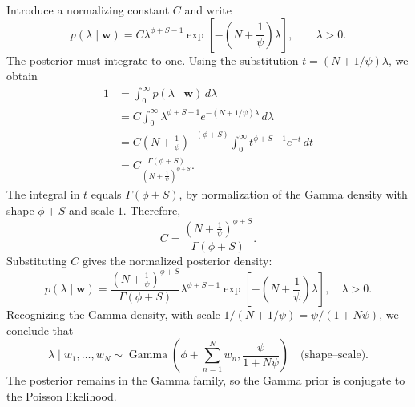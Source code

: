 \documentclass[11pt,letterpaper]{article}
\begin{document}
Introduce a normalizing constant $C$ and write
\[
  p(\lambda\mid\mathbf{w})
  =C\lambda^{\phi+S-1}
  \exp\!\left[-\left(N+\frac{1}{\psi}\right)\lambda\right],
  \qquad \lambda>0.
\]
The posterior must integrate to one. Using the substitution
$t=(N+1/\psi)\lambda$, we obtain
\begin{align*}
  1
   & =\int_{0}^{\infty}p(\lambda\mid\mathbf{w})\,d\lambda \\
   & =C\int_{0}^{\infty}\lambda^{\phi+S-1}
  e^{-(N+1/\psi)\lambda}\,d\lambda                        \\
   & =C\left(N+\frac{1}{\psi}\right)^{-(\phi+S)}
  \int_{0}^{\infty}t^{\phi+S-1}e^{-t}\,dt                 \\
   & =C\frac{\Gamma(\phi+S)}
  {\left(N+\frac{1}{\psi}\right)^{\phi+S}}.
\end{align*}
The integral in $t$ equals $\Gamma(\phi+S)$, by normalization of the
Gamma density with shape $\phi+S$ and scale $1$.
Therefore,
\[
  C=\frac{\left(N+\frac{1}{\psi}\right)^{\phi+S}}
  {\Gamma(\phi+S)}.
\]
Substituting $C$ gives the normalized posterior density:
\[
  \boxed{
    p(\lambda\mid\mathbf{w})
    =\frac{\left(N+\frac{1}{\psi}\right)^{\phi+S}}
    {\Gamma(\phi+S)}
    \lambda^{\phi+S-1}
    \exp\!\left[-\left(N+\frac{1}{\psi}\right)\lambda\right],
    \quad \lambda>0.
  }
\]
Recognizing the Gamma density, with scale
$1/(N+1/\psi)=\psi/(1+N\psi)$, we conclude that
\[
  \boxed{
    \lambda\mid w_1,\ldots,w_N
    \sim\operatorname{Gamma}\!\left(
    \phi+\sum_{n=1}^{N}w_n,
    \frac{\psi}{1+N\psi}
    \right)
    \quad\text{(shape--scale).}
  }
\]
The posterior remains in the Gamma family, so the Gamma prior is conjugate
to the Poisson likelihood.
\end{document}
